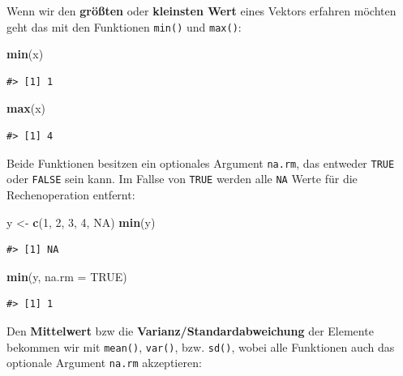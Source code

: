 \documentclass[]{tufte-book}
\newenvironment{Shaded}{}{}
\newcommand{\KeywordTok}[1]{\textcolor[rgb]{0.00,0.44,0.13}{\textbf{#1}}}
\newcommand{\DataTypeTok}[1]{\textcolor[rgb]{0.56,0.13,0.00}{#1}}
\newcommand{\DecValTok}[1]{\textcolor[rgb]{0.25,0.63,0.44}{#1}}
\newcommand{\StringTok}[1]{\textcolor[rgb]{0.25,0.44,0.63}{#1}}
\newcommand{\OtherTok}[1]{\textcolor[rgb]{0.00,0.44,0.13}{#1}}
\newcommand{\NormalTok}[1]{#1}
\begin{document}
Wenn wir den \textbf{größten} oder \textbf{kleinsten Wert} eines Vektors
erfahren möchten geht das mit den Funktionen \texttt{min()} und
\texttt{max()}:

\begin{Shaded}
\begin{Highlighting}[]
\KeywordTok{min}\NormalTok{(x)}
\end{Highlighting}
\end{Shaded}

\begin{verbatim}
#> [1] 1
\end{verbatim}

\begin{Shaded}
\begin{Highlighting}[]
\KeywordTok{max}\NormalTok{(x)}
\end{Highlighting}
\end{Shaded}

\begin{verbatim}
#> [1] 4
\end{verbatim}

Beide Funktionen besitzen ein optionales Argument \texttt{na.rm}, das
entweder \texttt{TRUE} oder \texttt{FALSE} sein kann. Im Fallse von
\texttt{TRUE} werden alle \texttt{NA} Werte für die Rechenoperation
entfernt:

\begin{Shaded}
\begin{Highlighting}[]
\NormalTok{y <-}\StringTok{ }\KeywordTok{c}\NormalTok{(}\DecValTok{1}\NormalTok{, }\DecValTok{2}\NormalTok{, }\DecValTok{3}\NormalTok{, }\DecValTok{4}\NormalTok{, }\OtherTok{NA}\NormalTok{)}
\KeywordTok{min}\NormalTok{(y)}
\end{Highlighting}
\end{Shaded}

\begin{verbatim}
#> [1] NA
\end{verbatim}

\begin{Shaded}
\begin{Highlighting}[]
\KeywordTok{min}\NormalTok{(y, }\DataTypeTok{na.rm =} \OtherTok{TRUE}\NormalTok{)}
\end{Highlighting}
\end{Shaded}

\begin{verbatim}
#> [1] 1
\end{verbatim}

Den \textbf{Mittelwert} bzw die \textbf{Varianz/Standardabweichung} der
Elemente bekommen wir mit \texttt{mean()}, \texttt{var()}, bzw.
\texttt{sd()}, wobei alle Funktionen auch das optionale Argument
\texttt{na.rm} akzeptieren:
\end{document}
